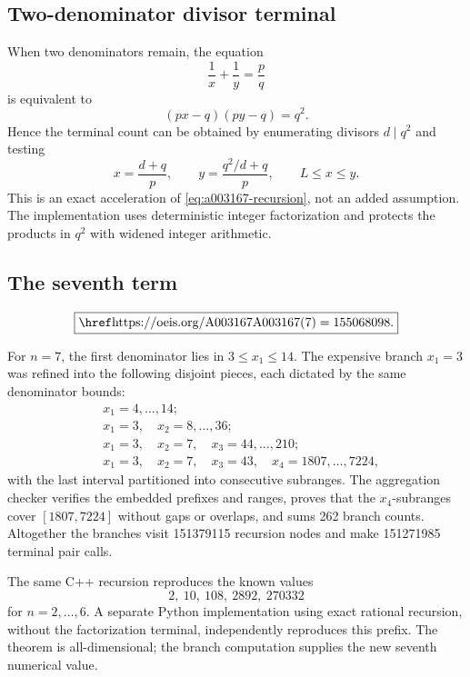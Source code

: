 \subsection{Two-denominator divisor terminal}

When two denominators remain, the equation
\[
 \frac1x+\frac1y=\frac pq
\]
is equivalent to
\begin{equation}
 (px-q)(py-q)=q^2.
 \label{eq:a003167-factor}
\end{equation}
Hence the terminal count can be obtained by enumerating divisors \(d\mid q^2\)
and testing
\begin{equation}
 x=\frac{d+q}{p},
 \qquad
 y=\frac{q^2/d+q}{p},
 \qquad
 L\le x\le y.
 \label{eq:a003167-terminal}
\end{equation}
This is an exact acceleration of \cref{eq:a003167-recursion}, not an added
assumption.  The implementation uses deterministic integer factorization and
protects the products in \(q^2\) with widened integer arithmetic.

\subsection{The seventh term}

\begin{resultbox}
\[
 \boxed{\seq{A003167}(7)=155068098.}
\]
\end{resultbox}

For \(n=7\), the first denominator lies in \(3\le x_1\le14\).  The expensive
branch \(x_1=3\) was refined into the following disjoint pieces, each dictated
by the same denominator bounds:
\begin{align*}
 &x_1=4,\ldots,14;\\
 &x_1=3,\quad x_2=8,\ldots,36;\\
 &x_1=3,\quad x_2=7,\quad x_3=44,\ldots,210;\\
 &x_1=3,\quad x_2=7,\quad x_3=43,
      \quad x_4=1807,\ldots,7224,
\end{align*}
with the last interval partitioned into consecutive subranges.  The
aggregation checker verifies the embedded prefixes and ranges, proves that the
\(x_4\)-subranges cover \([1807,7224]\) without gaps or overlaps, and sums 262
branch counts.  Altogether the branches visit 151379115 recursion nodes and
make 151271985 terminal pair calls.

The same C++ recursion reproduces the known values
\[
 2,\ 10,\ 108,\ 2892,\ 270332
\]
for \(n=2,\ldots,6\).  A separate Python implementation using exact rational
recursion, without the factorization terminal, independently reproduces this
prefix.  The theorem is all-dimensional; the branch computation supplies the
new seventh numerical value.
